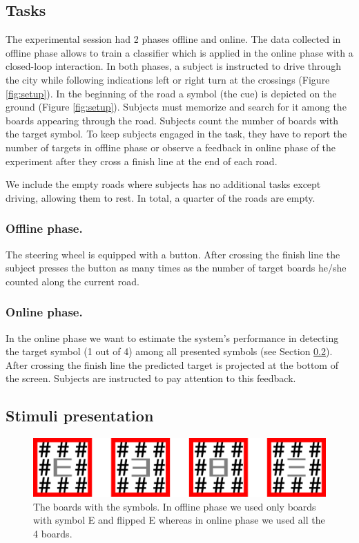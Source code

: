 \documentclass[12pt]{iopart}
\begin{document}
\subsection{Tasks}
The experimental session had 2 phases offline and online.
The data collected in offline phase allows to train a classifier
which is applied in the online phase with a closed-loop interaction.
In both phases, a subject is instructed to drive through the city while
following indications left or right turn at the crossings (Figure \ref{fig:setup}).
In the beginning of the road a symbol (the cue) is depicted
on the ground (Figure \ref{fig:setup}). Subjects must memorize and search for it among
the boards appearing through the road.
Subjects count the number of boards with the target symbol. 
To keep subjects engaged in the task, they have to
report the number of targets in offline phase or observe a
feedback in online phase of the experiment
after they cross a finish line at the end of each road.

We include the empty roads where subjects has no additional tasks 
except driving, allowing them to rest.
In total, a quarter of the roads are empty.

\subsubsection*{Offline phase.}
The steering wheel is equipped with a button.
After crossing the finish line the subject presses the button as many times
as the number of target boards he/she counted along the current road.

\subsubsection*{Online phase.}
In the online phase we want to estimate the system's performance
in detecting the target symbol (1 out of 4) among all presented
symbols (see Section \ref{sec:stim}). 
After crossing the finish line the predicted target is projected
at the bottom of the screen. Subjects are instructed to pay
attention to this feedback.


\subsection{Stimuli presentation}
\label{sec:stim}

\begin{figure}[!t]
    \includegraphics[trim={0cm 0cm 0cm 0cm},clip,width=0.80\columnwidth]{../images/Stimuli.png}
    \caption{The boards with the symbols. In offline phase we used only boards 
        with symbol E and flipped E whereas in online phase we used all the 4 boards.}
\label{fig:boards}
\end{figure}
\end{document}
